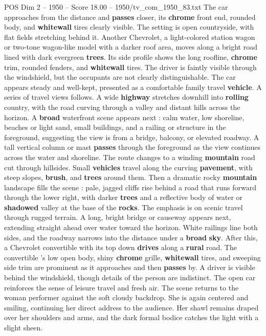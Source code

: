 \begin{textsample}{POS Dim 2 – 1950 – Score 18.00 – 1950/tv\_com\_1950\_83.txt}
The car approaches from the distance and \textbf{passes} closer, its \textbf{chrome} front end, rounded body, and \textbf{whitewall} tires clearly visible.
The setting is open countryside, with flat fields stretching behind it.
Another Chevrolet, a light-colored station wagon or two-tone wagon-like model with a darker roof area, moves along a bright road lined with dark evergreen \textbf{trees}.
Its side profile shows the long roofline, \textbf{chrome} trim, rounded fenders, and \textbf{whitewall} tires.
The driver is faintly visible through the windshield, but the occupants are not clearly distinguishable.
The car appears steady and well-kept, presented as a comfortable family travel \textbf{vehicle}.
A series of travel views follows.
A wide \textbf{highway} stretches downhill into \textbf{rolling} country, with the road curving through a valley and distant hills across the horizon.
A \textbf{broad} waterfront scene appears next : calm water, low shoreline, beaches or light sand, small buildings, and a railing or structure in the foreground, suggesting the view is from a bridge, balcony, or elevated roadway.
A tall vertical column or mast \textbf{passes} through the foreground as the view continues across the water and shoreline.
The route changes to a winding \textbf{mountain} road cut through hillsides.
Small \textbf{vehicles} travel along the curving \textbf{pavement}, with steep slopes, \textbf{brush}, and \textbf{trees} around them.
Then a dramatic rocky \textbf{mountain} landscape fills the scene : pale, jagged cliffs rise behind a road that runs forward through the lower right, with darker \textbf{trees} and a reflective body of water or \textbf{shadowed} valley at the base of the \textbf{rocks}.
The emphasis is on scenic travel through rugged terrain.
A long, bright bridge or causeway appears next, extending straight ahead over water toward the horizon.
White railings line both sides, and the roadway narrows into the distance under a \textbf{broad} \textbf{sky}.
After this, a Chevrolet convertible with its top down \textbf{drives} along a \textbf{rural} road.
The convertible ’s low open body, shiny \textbf{chrome} grille, \textbf{whitewall} tires, and sweeping side trim are prominent as it approaches and then \textbf{passes} by.
A driver is visible behind the windshield, though details of the person are indistinct.
The open car reinforces the sense of leisure travel and fresh air.
The scene returns to the woman performer against the soft cloudy backdrop.
She is again centered and smiling, continuing her direct address to the audience.
Her shawl remains draped over her shoulders and arms, and the dark formal bodice catches the light with a slight sheen.

\end{textsample}
